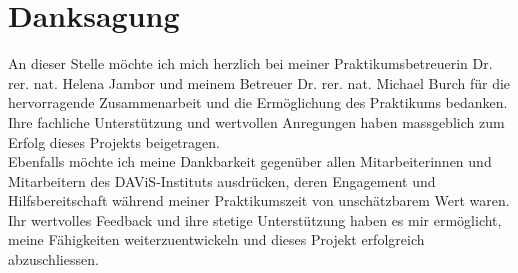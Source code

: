 \documentclass[a4paper, 12pt]{scrartcl}
\begin{document}
\clearpage
	\section{Danksagung}
	\label{sec:danksagung}
An dieser Stelle möchte ich mich herzlich bei meiner Praktikumsbetreuerin Dr. rer. nat. Helena Jambor und meinem Betreuer Dr. rer. nat. Michael Burch für die hervorragende Zusammenarbeit und die Ermöglichung des Praktikums bedanken. Ihre fachliche Unterstützung und wertvollen Anregungen haben massgeblich zum Erfolg dieses Projekts beigetragen.\\[1em]Ebenfalls möchte ich meine Dankbarkeit gegenüber allen Mitarbeiterinnen und Mitarbeitern des DAViS-Instituts ausdrücken, deren Engagement und Hilfsbereitschaft während meiner Praktikumszeit von unschätzbarem Wert waren. Ihr wertvolles Feedback und ihre stetige Unterstützung haben es mir ermöglicht, meine Fähigkeiten weiterzuentwickeln und dieses Projekt erfolgreich abzuschliessen.


\intextsep 5pt




\newpage
{}
\setcounter{page}{4}

\newpage
\nocite{*} %
\printbibliography[heading=bibnumbered, title={Literaturverzeichnis}, notkeyword=verwendet] %








%




\end{document}

